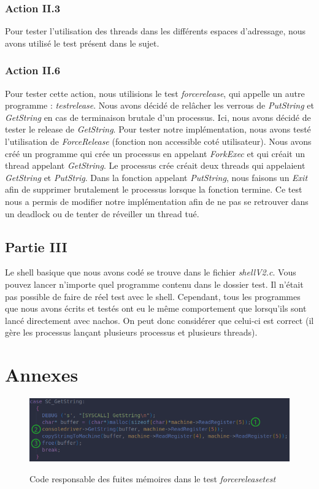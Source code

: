\documentclass{article}
\begin{document}
\subsubsection{Action II.3}
Pour tester l'utilisation des threads dans les différents espaces d'adressage, nous avons utilisé le test présent dans le sujet.

\subsubsection{Action II.6}
Pour tester cette action, nous utilisions le test \textit{forcerelease}, qui appelle un autre programme : \textit{testrelease}.
Nous avons décidé de relâcher les verrous de \textit{PutString} et \textit{GetString} en cas de terminaison brutale d'un processus.
Ici, nous avons décidé de tester le release de \textit{GetString}.
Pour tester notre implémentation, nous avons testé l'utilisation de \textit{ForceRelease} (fonction non accessible coté utilisateur).
Nous avons créé un programme qui crée un processus en appelant \textit{ForkExec} et qui créait un thread appelant  \textit{GetString}.
Le processus crée créait deux threads qui appelaient  \textit{GetString} et  \textit{PutStrig}. Dans la fonction appelant \textit{PutString},
nous faisons un \textit{Exit} afin de supprimer brutalement le processus lorsque la fonction termine. Ce test nous a permis de modifier notre 
implémentation afin de ne pas se retrouver dans un deadlock ou de tenter de réveiller un thread tué.

\subsection{Partie III}
Le shell basique que nous avons codé se trouve dans le fichier \textit{shellV2.c}. Vous pouvez lancer n'importe quel programme contenu dans le 
dossier test. Il n'était pas possible de faire de réel test avec le shell. Cependant, tous les programmes que nous avons écrits et testés ont eu le
même comportement que lorsqu'ils sont lancé directement avec nachos. On peut donc considérer que celui-ci est correct (il gère les processus lançant
plusieurs processus et plusieurs threads).
\pagebreak
\section{Annexes}
\begin{figure}[h]
    \caption{Code responsable des fuites mémoires dans le test \textit{forcereleasetest}}
    \centering
    \includegraphics[width=\textwidth,height=\textheight,keepaspectratio]{Leak}
    \label{fig:fuites}
\end{figure}
\end{document}
